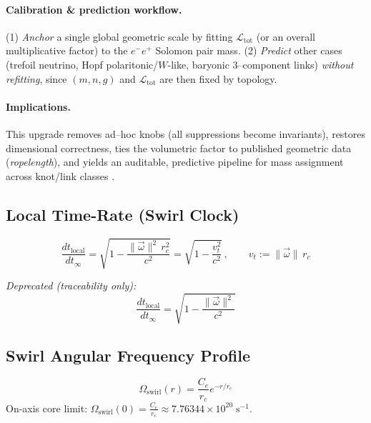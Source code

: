 \documentclass[11pt, a4paper]{article}
\begin{document}
\paragraph{Calibration \& prediction workflow.}
(1) \emph{Anchor} a single global geometric scale by fitting \(\mathcal{L}_{\mathrm{tot}}\) (or an overall multiplicative factor) to the \(e^-e^+\) Solomon pair mass.
(2) \emph{Predict} other cases (trefoil neutrino, Hopf polaritonic/\(W\)-like, baryonic 3–component links) \emph{without refitting}, since \((m,n,g)\) and \(\mathcal{L}_{\mathrm{tot}}\) are then fixed by topology.

\paragraph{Implications.}
This upgrade removes ad–hoc knobs (all suppressions become invariants), restores dimensional correctness, ties the volumetric factor to published geometric data (\emph{ropelength}), and yields an auditable, predictive pipeline for mass assignment across knot/link classes \cite{Rolfsen1976Knots,Lickorish1997Knots,Murasugi1996KnotTheory,CantarellaKusnerSullivan2002Ropelength,Rawdon2003Approximating,Batchelor1967Fluid}.


\subsection{Local Time-Rate (Swirl Clock)}

\begin{equation}
    \boxed{\;
    \frac{dt_{\text{local}}}{dt_{\infty}}
        = \sqrt{1 - \frac{\lVert\vec{\omega}\rVert^{2}\,r_c^{2}}{c^{2}}}
        = \sqrt{1 - \frac{v_t^{2}}{c^{2}}}\,,\qquad
        v_t := \lVert\vec{\omega}\rVert\, r_c
        \;}
\end{equation}

\noindent\textit{Deprecated (traceability only):}
\begin{equation}
    \frac{dt_{\text{local}}}{dt_{\infty}} = \sqrt{1 - \frac{\lVert\vec{\omega}\rVert^{2}}{c^{2}}}
\end{equation}

\subsection{Swirl Angular Frequency Profile}

\begin{equation}
\Omega_{\text{swirl}}(r) = \frac{C_e}{r_c} e^{-r/r_c}
\end{equation}
On-axis core limit: $\Omega_{\text{swirl}}(0)=\frac{C_e}{r_c}\approx 7.76344\times10^{20}\;\text{s}^{-1}$.
\end{document}
